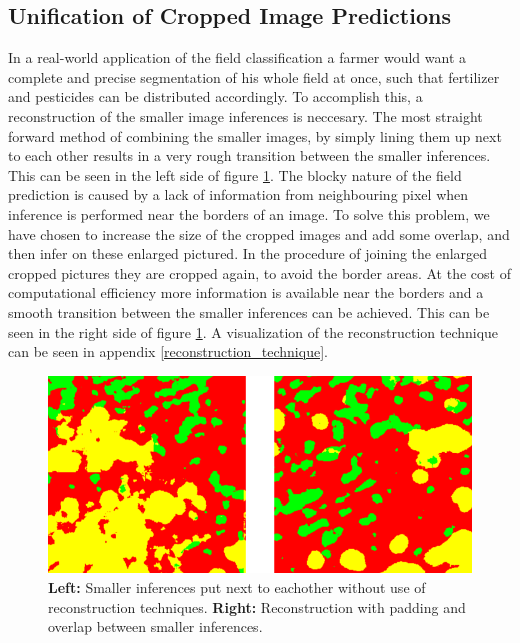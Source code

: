 \documentclass{article}
\begin{document}
\subsection{Unification of Cropped Image Predictions}
In a real-world application of the field classification a farmer would want a complete and precise segmentation of his whole field at once, such that fertilizer and pesticides can be distributed accordingly. To accomplish this, a reconstruction of the smaller image inferences is neccesary. The most straight forward method of combining the smaller images, by simply lining them up next to each other results in a very rough transition between the smaller inferences. This can be seen in the left side of figure \ref{fig:earlylatereconstruction}. The blocky nature of the field prediction is caused by a lack of information from neighbouring pixel when inference is performed near the borders of an image. To solve this problem, we have chosen to increase the size of the cropped images and add some overlap, and then infer on these enlarged pictured. In the procedure of joining the enlarged cropped pictures they are cropped again, to avoid the border areas. At the cost of computational efficiency more information is available near the borders and a smooth transition between the smaller inferences can be achieved. This can be seen in the right side of figure \ref{fig:earlylatereconstruction}. A visualization of the reconstruction technique can be seen in appendix \ref{reconstruction_technique}.



\begin{figure}
	\centering
	\includegraphics[width=0.9\linewidth]{early_late_reconstruction2}
	\caption{\textbf{Left:} Smaller inferences put next to eachother without use of reconstruction techniques. \textbf{Right:} Reconstruction with padding and overlap between smaller inferences.}
	\label{fig:earlylatereconstruction}
\end{figure}
\end{document}

